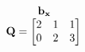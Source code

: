 \documentclass[preview]{standalone}
\begin{document}
\begin{align*}
\begin{array}{ccc}\begin{matrix}\hspace{1cm} \mathbf{b_{x}}  \quad \hspace{0.6cm} \end{matrix} \\ \mathbf{Q} = \begin{bmatrix} 2 & 1 & 1 \\ 0 & 2 & 3 \end{bmatrix} \end{array}
\end{align*}
\end{document}
